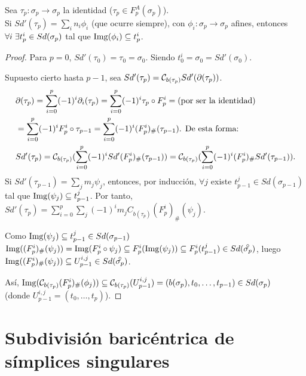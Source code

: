Sea $\tau_p \colon \sigma_p \to \sigma_p$ la identidad ($\tau_p \in F_p^A(\sigma_p)$). \\
Si $Sd'(\tau_p) = \sum_i n_i \phi_i$ (que ocurre siempre), con $\phi_i \colon \sigma_p \to \sigma_p$ afines, entonces
$\forall i \hspace{0.3em} \exists t_p^i \in Sd(\sigma_p)$ tal que $\operatorname{Img}(\phi_i) \subseteq t_p^i$.

\begin{proof}
  Para $p = 0$, $Sd'(\tau_0) = \tau_0 = \sigma_0$. Siendo $t_0^i = \sigma_0 = Sd'(\sigma_0)$.

  Supuesto cierto hasta $p-1$, sea $Sd'(\tau_p) = {\mathcal C}_{b(\tau_p)} Sd'(\partial(\tau_p))$.
  \begin{align*}
    &\partial(\tau_p) = \sum\limits_{i = 0}^p (-1)^i \partial_i(\tau_p) = \sum\limits_{i = 0}^p (-1)^i \tau_p \circ F_p^i = \text{(por ser la identidad)} \\
    &= \sum\limits_{i = 0}^p (-1)^i F_p^i \circ \tau_{p-1} = \sum\limits_{i = 0}^p (-1)^i(F_p^i)_\# (\tau_{p-1}) \text{. De esta forma:} \\
    &Sd'(\tau_p) = {\mathcal C}_{b(\tau_p)}(\sum\limits_{i = 0}^p (-1)^i Sd'(F_p^i)_\# (\tau_{p-1})) = {\mathcal C}_{b(\tau_p)}(\sum\limits_{i = 0}^p (-1)^i(F_p^i)_\# Sd'(\tau_{p-1})).
  \end{align*}
  Si $Sd'(\tau_{p-1}) = \sum\limits_j m_j \psi_j$, entonces, por inducción, $\forall j$ existe $t_{p-1}^j \in Sd(\sigma_{p-1})$ tal que
  $\operatorname{Img}(\psi_j) \subseteq t_{p-1}^j$. Por tanto, $Sd'(\tau_p) = \sum\limits_{i = 0}^p \sum\limits_j (-1)^i m_j C_{b(\tau_p)}(F_p^i)_\# (\psi_j)$.

  Como $\operatorname{Img}(\psi_j) \subseteq t_{p-1}^j \in Sd(\sigma_{p-1})$
  $\Img((F_p^i)_\# (\psi_j)) = \Img(F_p^i \circ \psi_j) \subseteq F_p^i(\Img(\psi_j)) \subseteq F_p^i(t_{p-1}^j) \in Sd(\interior{\sigma_p})$,
  luego $\Img((F_p^i)_\# (\psi_j)) \subseteq U_{p-1}^{i,j} \in Sd(\interior{\sigma_p})$.

  Así, $\operatorname{Img}({\mathcal C}_{b(\tau_p)}(F_p^i)_\# (\phi_j)) \subseteq {\mathcal C}_{b(\tau_p)}(U_{p-1}^{i, j}) = (b(\sigma_p), t_0, \dots, t_{p-1}) \in Sd(\sigma_p)$\\
  (donde $U_{p-1}^{i,j} = (t_0, \dots, t_p)$).
\end{proof}

\section{Subdivisión baricéntrica de símplices singulares}

